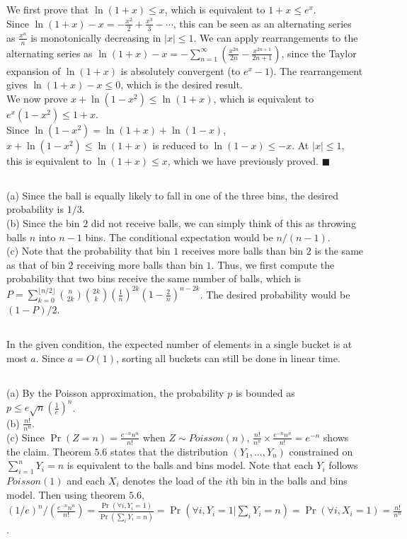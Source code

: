 \documentclass{article}
\begin{document}
\subsection{}
We first prove that $\ln(1+x)\leq x$, which is equivalent to $1+x\leq e^x$.\\
Since $\ln(1+x)-x= -\frac{x^2}{2}+\frac{x^3}{3}-\cdots$, this can be seen as an alternating series as $\frac{x^n}{n}$ is monotonically decreasing in $|x| \leq 1$.
We can apply rearrangements to the alternating series as $\ln(1+x)-x=-\sum\limits_{n=1}^\infty\left(\frac{x^{2n}}{2n}-\frac{x^{2n+1}}{2n+1}\right)$,
since the Taylor expansion of $\ln(1+x)$ is absolutely convergent (to $e^x-1$).
The rearrangement gives $\ln(1+x)-x \leq 0$, which is the desired result.\\
We now prove $x + \ln(1-x^2) \leq \ln(1+x)$, which is equivalent to $e^x(1-x^2) \leq 1+x$.\\
Since $\ln(1-x^2)=\ln(1+x)+\ln(1-x)$, $x + \ln(1-x^2) \leq \ln(1+x)$ is reduced to $\ln(1-x)\leq -x$. 
At $|x|\leq 1$, this is equivalent to $\ln(1+x)\leq x$, which we have previously proved. $\blacksquare$
\subsection{}
(a) Since the ball is equally likely to fall in one of the three bins, the desired probability is $1/3$.\\
(b) Since the bin $2$ did not receive balls, we can simply think of this as throwing balls $n$ into $n-1$ bins. The conditional expectation would be $n/(n-1)$.\\
(c) Note that the probability that bin $1$ receives more balls than bin $2$ is the same as that of bin $2$ receiving more balls than bin $1$. Thus, we first compute the probability that two bins receive the same number of balls, which is\\
$P=\sum\limits_{k=0}^{\lfloor n/2\rfloor}\binom{n}{2k}\binom{2k}{k}(\frac{1}{n})^{2k}(1-\frac{2}{n})^{n-2k}$.
The desired probability would be $(1-P)/2$.
\subsection{}
In the given condition, the expected number of elements in a single bucket is at most $a$. Since $a=O(1)$, sorting all buckets can still be done in linear time.
\subsection{}
(a) By the Poisson approximation, the probability $p$ is bounded as $p \leq e\sqrt{n}(\frac{1}{e})^n$.\\
(b) $\frac{n!}{n^n}$.\\
(c) Since $\Pr(Z=n)=\frac{e^{-n}n^n}{n!}$ when $Z\sim Poisson(n)$, $\frac{n!}{n^n}\times\frac{e^{-n}n^n}{n!}=e^{-n}$ shows the claim.
Theorem $5.6$ states that the distribution $(Y_1,...,Y_n)$ constrained on $\sum\limits_{i=1}^n Y_i=n$ is equivalent to the balls and bins model.
Note that each $Y_i$ follows $Poisson(1)$ and each $X_i$ denotes the load of the $i$th bin in the balls and bins model.
Then using theorem $5.6$, $(1/e)^n/(\frac{e^{-n}n^n}{n!})=\frac{\Pr(\forall i, Y_i=1)}{\Pr(\sum_iY_i=n)}=\Pr(\forall i,Y_i=1 | \sum_i Y_i=n)=\Pr(\forall i, X_i=1)=\frac{n!}{n^n}$.
\end{document}
